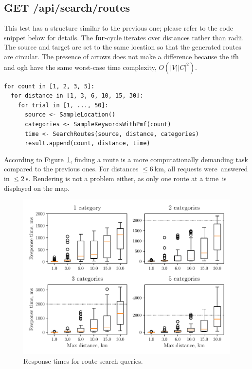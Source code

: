 \newpage

\subsection*{GET /api/search/routes}

This test has a structure similar to the previous one; please refer to the code snippet below for details. The \textbf{for}-cycle iterates over distances rather than radii. The source and target are set to the same location so that the generated routes are circular. The presence of arrows does not make a difference because the \acs{ifh} and \acs{ogh} have the same worst-case time complexity, $O(\lvert V \rvert \lvert C \rvert^{2})$.

\begin{verbatim}
for count in [1, 2, 3, 5]:
  for distance in [1, 3, 6, 10, 15, 30]:
    for trial in [1, ..., 50]:
      source <- SampleLocation()
      categories <- SampleKeywordsWithPmf(count)
      time <- SearchRoutes(source, distance, categories)
      result.append(count, distance, time)
\end{verbatim}

According to Figure~\ref{fig:perf-search-routes}, finding a route is a more computationally demanding task compared to the previous ones. For distances $\leq 6~\text{km}$, all requests were~answered in $\leq 2~\text{s}$. Rendering is not a problem either, as only one route at a time~is displayed on the map.

\vspace{3.1em}

\begin{figure}[!h]
  \centering
  \includegraphics[width=\linewidth]{img/testing/perf-search-routes.pdf}
  \caption{Response times for route search queries.}
  \label{fig:perf-search-routes}
\end{figure}

